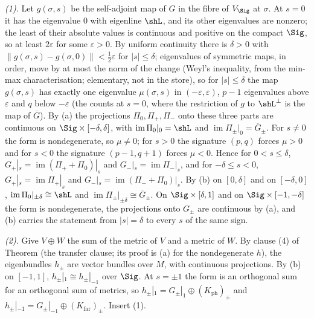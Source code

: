 \emph{(1).} Let $g(\sigma, s)$ be the self-adjoint map of $G$ in the fibre of $V_{\Sig}$ at $\sigma$. At $s = 0$ it has the eigenvalue $0$ with eigenline $\shL$, and its other eigenvalues are nonzero; the least of their absolute values is continuous and positive on the compact $\Sig$, so at least $2\varepsilon$ for some $\varepsilon > 0$. By uniform continuity there is $\delta > 0$ with $\|g(\sigma,s) - g(\sigma,0)\| < \tfrac12\varepsilon$ for $|s| \leq \delta$; eigenvalues of symmetric maps, in order, move by at most the norm of the change (Weyl's inequality, from the min-max characterisation; elementary, not in the store), so for $|s| \leq \delta$ the map $g(\sigma,s)$ has exactly one eigenvalue $\mu(\sigma,s)$ in $(-\varepsilon, \varepsilon)$, $p - 1$ eigenvalues above $\varepsilon$ and $q$ below $-\varepsilon$ (the counts at $s = 0$, where the restriction of $g$ to $\shL^{\perp}$ is the map of $\overline G$). By (a) the projections $\Pi_{0}, \Pi_{+}, \Pi_{-}$ onto these three parts are continuous on $\Sig \times [-\delta, \delta]$, with $\operatorname{im}\Pi_{0}|_{0} = \shL$ and $\operatorname{im}\Pi_{\pm}|_{0} = \overline G_{\pm}$. For $s \neq 0$ the form is nondegenerate, so $\mu \neq 0$; for $s > 0$ the signature $(p,q)$ forces $\mu > 0$ and for $s < 0$ the signature $(p-1,q+1)$ forces $\mu < 0$. Hence for $0 < s \leq \delta$, $G_{+}|_{s} = \operatorname{im}(\Pi_{+} + \Pi_{0})|_{s}$ and $G_{-}|_{s} = \operatorname{im}\Pi_{-}|_{s}$, and for $-\delta \leq s < 0$, $G_{+}|_{s} = \operatorname{im}\Pi_{+}|_{s}$ and $G_{-}|_{s} = \operatorname{im}(\Pi_{-} + \Pi_{0})|_{s}$. By (b) on $[0, \delta]$ and on $[-\delta, 0]$, $\operatorname{im}\Pi_{0}|_{\pm\delta} \cong \shL$ and $\operatorname{im}\Pi_{\pm}|_{\pm\delta} \cong \overline G_{\pm}$. On $\Sig \times [\delta, 1]$ and on $\Sig \times [-1, -\delta]$ the form is nondegenerate, the projections onto $G_{\pm}$ are continuous by (a), and (b) carries the statement from $|s| = \delta$ to every $s$ of the same sign.

\emph{(2).} Give $V \oplus W$ the sum of the metric of $V$ and a metric of $W$. By clause (4) of Theorem  (the transfer clause; its proof is (a) for the nondegenerate $h$), the eigenbundles $h_{\pm}$ are vector bundles over $M$, with continuous projections. By (b) on $[-1, 1]$, $h_{\pm}|_{1} \cong h_{\pm}|_{-1}$ over $\Sig$. At $s = \pm 1$ the form is an orthogonal sum for an orthogonal sum of metrics, so $h_{\pm}|_{1} = G_{\pm}|_{1} \oplus (K_{\mathrm{ph}})_{\pm}$ and $h_{\pm}|_{-1} = G_{\pm}|_{-1} \oplus (K_{\mathrm{far}})_{\pm}$. Insert (1).

